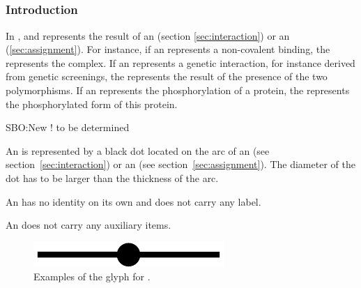 
\color{red}
\subsection{}\label{sec:outcome}

\subsubsection{Introduction}

In \ER, and  represents the result of an  (section \ref{sec:interaction}) or an  (\ref{sec:assignment}). For instance, if an  represents a non-covalent binding, the  represents the complex. If an  represents a genetic interaction, for instance derived from genetic screenings, the  represents the result of the presence of the two polymorphisms. If an  represents the phosphorylation of a protein, the  represents the phosphorylated form of this protein.

\begin{glyphDescription}

\glyphSboTerm SBO:New ! to be determined

\glyphContainer  An  is represented by a black dot located on the arc of an  (see section~\ref{sec:interaction}) or an  (see section~\ref{sec:assignment}). The diameter of the dot has to be larger than the thickness of the arc.

\glyphLabel An  has no identity on its own and does not carry any label. 

\glyphAux An  does not carry any auxiliary items.

\end{glyphDescription}

\begin{figure}[H]
  \centering
  \includegraphics[scale = 0.3, trim = 0 0 0 0.25in]{images/outcome}
  \caption{Examples of the \ER glyph for .}
  \label{fig:outcome}
\end{figure}

\normalcolor
	
